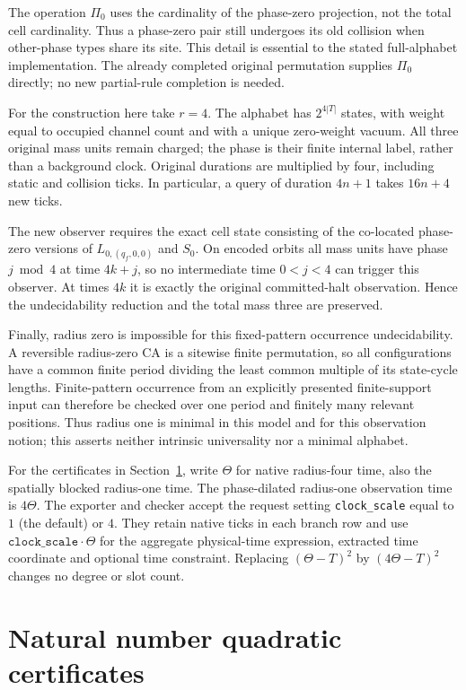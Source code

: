 \documentclass[11pt,letterpaper]{article}
\numberwithin{equation}{section}
\theoremstyle{definition}
\theoremstyle{remark}
\begin{document}
The operation $\Pi_0$ uses the cardinality of the phase-zero projection,
not the total cell cardinality. Thus a phase-zero pair still undergoes
its old collision when other-phase types share its site. This detail
is essential to the stated full-alphabet implementation. The already
completed original permutation supplies $\Pi_0$ directly; no new
partial-rule completion is needed.

For the construction here take $r=4$. The alphabet has
$2^{4|T|}$ states, with weight equal to occupied channel count and with
a unique zero-weight vacuum. All three original mass units remain
charged; the phase is their finite internal label, rather than a
background clock. Original durations are multiplied by four, including
static and collision ticks. In particular, a query of duration $4n+1$
takes $16n+4$ new ticks.

The new observer requires the exact cell state consisting of the co-located phase-zero versions of
$L_{0,(q_f,0,0)}$ and $S_0$. On encoded orbits all mass units have phase
$j\bmod4$ at time $4k+j$, so no intermediate time $0<j<4$ can trigger
this observer. At times $4k$ it is exactly the original committed-halt
observation. Hence the undecidability reduction and the total mass
three are preserved.

Finally, radius zero is impossible for this fixed-pattern occurrence
undecidability. A reversible radius-zero CA is a sitewise finite
permutation, so all configurations have a common finite period dividing
the least common multiple of its state-cycle lengths. Finite-pattern
occurrence from an explicitly presented finite-support input can therefore be
checked over one period and finitely many relevant positions. Thus
radius one is minimal in this model and for this observation notion;
this asserts neither intrinsic universality nor a minimal alphabet.

For the certificates in Section~\ref{smc:tm:sec:certificate}, write $\Theta$ for
native radius-four time, also the spatially blocked radius-one time. The phase-dilated radius-one observation time is $4\Theta$.
The exporter and checker accept the request setting \texttt{clock\_scale}
equal to $1$ (the default) or $4$. They retain native ticks in each branch
row and use $\texttt{clock\_scale}\cdot\Theta$ for the aggregate physical-time
expression, extracted time coordinate and optional time constraint.
Replacing $(\Theta-T)^2$ by $(4\Theta-T)^2$ changes no degree or slot count.


\section{Natural number quadratic certificates}\label{smc:tm:sec:certificate}
\end{document}
